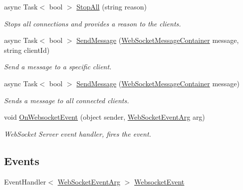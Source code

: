 \begin{DoxyCompactItemize}
async Task$<$ bool $>$ \mbox{\hyperlink{class_simple_web_socket_server_library_1_1_simple_web_socket_handler_1_1_web_socket_handler_a77f5d9d54d3a2a3032b5ce1f21d5ef34}{Stop\+All}} (string reason)
\begin{DoxyCompactList}\small\item\em Stops all connections and provides a reason to the clients. \end{DoxyCompactList}\item 
async Task$<$ bool $>$ \mbox{\hyperlink{class_simple_web_socket_server_library_1_1_simple_web_socket_handler_1_1_web_socket_handler_abee1c137ad80d04fb2a1de7644d2d60d}{Send\+Message}} (\mbox{\hyperlink{class_simple_web_socket_server_library_1_1_web_socket_message_container}{Web\+Socket\+Message\+Container}} message, string client\+Id)
\begin{DoxyCompactList}\small\item\em Send a message to a specific client. \end{DoxyCompactList}\item 
async Task$<$ bool $>$ \mbox{\hyperlink{class_simple_web_socket_server_library_1_1_simple_web_socket_handler_1_1_web_socket_handler_af6f2bd90d72a21a48f1f46a0d42af80d}{Send\+Message}} (\mbox{\hyperlink{class_simple_web_socket_server_library_1_1_web_socket_message_container}{Web\+Socket\+Message\+Container}} message)
\begin{DoxyCompactList}\small\item\em Sends a message to all connected clients. \end{DoxyCompactList}\item 
void \mbox{\hyperlink{class_simple_web_socket_server_library_1_1_simple_web_socket_handler_1_1_web_socket_handler_a54df3f3848a5b8eecb4eba76ac9a328c}{On\+Websocket\+Event}} (object sender, \mbox{\hyperlink{class_simple_web_socket_server_library_1_1_web_socket_event_arg}{Web\+Socket\+Event\+Arg}} arg)
\begin{DoxyCompactList}\small\item\em Web\+Socket Server event handler, fires the event. \end{DoxyCompactList}\end{DoxyCompactItemize}
\subsection*{Events}
\begin{DoxyCompactItemize}
\item 
Event\+Handler$<$ \mbox{\hyperlink{class_simple_web_socket_server_library_1_1_web_socket_event_arg}{Web\+Socket\+Event\+Arg}} $>$ \mbox{\hyperlink{class_simple_web_socket_server_library_1_1_simple_web_socket_handler_1_1_web_socket_handler_adbe536b05d81b80f879bb6742ee53eb8}{Websocket\+Event}}
\end{DoxyCompactItemize}
